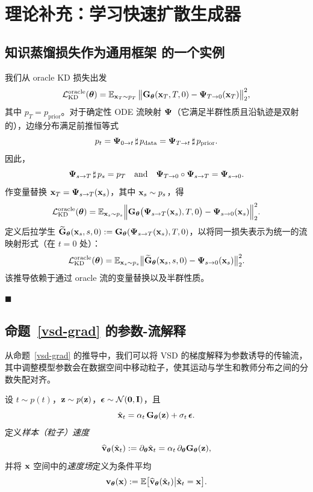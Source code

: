 \section{理论补充：学习快速扩散生成器}\label{app-sec:flow-map}

\subsection{知识蒸馏损失作为通用框架  的一个实例}

我们从 oracle KD 损失出发
\[
\mathcal{L}_{\mathrm{KD}}^{\text{oracle}}({\bm{\theta}})
=\mathbb{E}_{{\mathbf{x}}_T\sim p_T}\,
\big\|{\mathbf{G}}_{\bm{\theta}}({\mathbf{x}}_T,T,0)-{\bm{\Psi}}_{T\to 0}({\mathbf{x}}_T)\big\|_2^2,
\]
其中 $p_T = p_{\mathrm{prior}}$。对于确定性 ODE 流映射 ${\bm{\Psi}}$（它满足半群性质且沿轨迹是双射的），边缘分布满足前推恒等式
\[
p_t
= {\bm{\Psi}}_{0\to t}\,\sharp\,p_{\mathrm{data}}
= {\bm{\Psi}}_{T\to t}\,\sharp\,p_{\mathrm{prior}}.
\]
因此，
\[
{\bm{\Psi}}_{s\to T}\,\sharp\,p_s=p_T
\quad\text{and}\quad
{\bm{\Psi}}_{T\to 0}\circ{\bm{\Psi}}_{s\to T}={\bm{\Psi}}_{s\to 0}.
\]
作变量替换 ${\mathbf{x}}_T={\bm{\Psi}}_{s\to T}({\mathbf{x}}_s)$，其中 ${\mathbf{x}}_s\sim p_s$，得
\[
\mathcal{L}_{\mathrm{KD}}^{\text{oracle}}({\bm{\theta}})
= \mathbb{E}_{{\mathbf{x}}_s\sim p_s} 
\Big\|{\mathbf{G}}_{\bm{\theta}} \big({\bm{\Psi}}_{s\to T}({\mathbf{x}}_s),T,0\big)
- {\bm{\Psi}}_{s\to 0}({\mathbf{x}}_s)\Big\|_2^2.
\]
定义后拉学生 $\widetilde{{\mathbf{G}}}_{\bm{\theta}}({\mathbf{x}}_s,s,0):=
{\mathbf{G}}_{\bm{\theta}}({\bm{\Psi}}_{s\to T}({\mathbf{x}}_s),T,0)$，以将同一损失表示为统一的流映射形式（在 $t=0$ 处）：
\begin{align*}
\mathcal{L}_{\mathrm{KD}}^{\text{oracle}}({\bm{\theta}})
= \mathbb{E}_{{\mathbf{x}}_s\sim p_s} 
\big\|\widetilde{{\mathbf{G}}}_{\bm{\theta}}({\mathbf{x}}_s,s,0)-{\bm{\Psi}}_{s\to 0}({\mathbf{x}}_s)\big\|_2^2.
\end{align*}
该推导依赖于通过 oracle 流的变量替换以及半群性质。

\hfill$\blacksquare$

\subsection{命题~\ref{vsd-grad} 的参数-流解释}
从命题~\ref{vsd-grad} 的推导中，我们可以将 VSD 的梯度解释为参数诱导的传输流，其中调整模型参数会在数据空间中移动粒子，使其运动与学生和教师分布之间的分数失配对齐。

设 $t\sim p(t)$，${\mathbf{z}}\sim p({\mathbf{z}})$，${\bm{\epsilon}}\sim\mathcal N(\bm{0},{\mathbf{I}})$，且
\[
\hat{{\mathbf{x}}}_t=\alpha_t\,{\mathbf{G}}_{\bm{\theta}}({\mathbf{z}})+\sigma_t\,{\bm{\epsilon}}.
\]
定义\emph{样本（粒子）速度}
\[
\widehat{{\mathbf{v}}}_{\bm{\theta}}(\hat{{\mathbf{x}}}_t):=\partial_{\bm{\theta}} \hat{{\mathbf{x}}}_t=\alpha_t\,\partial_{\bm{\theta}} {\mathbf{G}}_{\bm{\theta}}({\mathbf{z}}),
\]
并将 ${\mathbf{x}}$ 空间中的\emph{速度场}定义为条件平均
\[
{\mathbf{v}}_{\bm{\theta}}({\mathbf{x}}):=\mathbb{E} \big[\widehat{{\mathbf{v}}}_{\bm{\theta}}(\hat{{\mathbf{x}}}_t) \big| \hat{{\mathbf{x}}}_t={\mathbf{x}}\big].
\]

